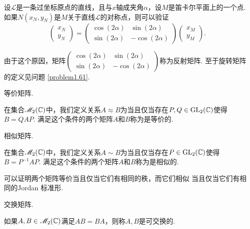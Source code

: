   \begin{nota}
    设$\mathscr L$是一条过坐标原点的直线，且与$x$轴成夹角$\alpha$，设$M$是笛卡尔平面上的一个点. 如果$N(x_N,y_N)$是$M$关于直线$\mathcal L$的对称点，则可以验证
    \[
      \begin{pmatrix}
        x_N \\ y_N
      \end{pmatrix} =
      \begin{pmatrix}
        \cos(2\alpha) & \sin(2\alpha) \\
        \sin(2\alpha) & -\cos(2\alpha)
      \end{pmatrix}
      \begin{pmatrix}
        x_M \\ y_M
      \end{pmatrix}.
    \]

    由于这个原因，矩阵$\begin{pmatrix}
        \cos(2\alpha) & \sin(2\alpha) \\
        \sin(2\alpha) & -\cos(2\alpha)
      \end{pmatrix}$称为{\kaishu 反射矩阵}. 至于旋转矩阵的定义见问题 \ref{problem1.61}.
  \end{nota}

  \begin{definition}
    {\kaishu 等价矩阵}.

    在集合$\mathscr M_2(\mathbb C)$中，我们定义关系$A\approx B$为当且仅当存在$P,Q\in\operatorname{GL}_2(\mathbb C)$使得$B=QAP$. 满足这个条件的两个矩阵$A$和$B$称为是{\kaishu 等价的}.
  \end{definition}

  \begin{definition}
    {\kaishu 相似矩阵}.

    在集合$\mathscr M_2(\mathbb C)$中，我们定义关系$A\sim B$为当且仅当存在$P\in\operatorname{GL}_2(\mathbb C)$使得$B=P^{-1}AP$. 满足这个条件的两个矩阵$A$和$B$称为是{\kaishu 相似的}.
  \end{definition}

  \begin{remark}
    可以证明两个矩阵{\kaishu 等价}当且仅当它们有相同的{\kaishu 秩}，而它们{\kaishu 相似} 当且仅当它们有相同的{\kaishu Jordan 标准形}.
  \end{remark}

  \begin{definition}
    {\kaishu 交换矩阵}.

    如果$A,B\in\mathscr M_2(\mathbb C)$满足$AB=BA$，则称$A,B$是{\kaishu 可交换的}.
  \end{definition}

